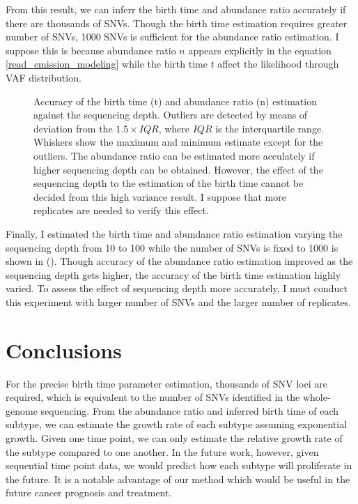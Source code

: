 \documentclass{article}
\begin{document}
From this result, we can inferr the birth time and abundance ratio accurately if there are thousands of SNVs.
Though the birth time estimation requires greater number of SNVs, 1000 SNVs is sufficient for the abundance ratio estimation.
I suppose this is because abundance ratio $n$ appears explicitly in the equation \ref{read_emission_modeling} while the birth time $t$ affect the likelihood through VAF distribution.

\begin{figure}[H]
   \caption{
 Accuracy of the birth time (t) and abundance ratio (n) estimation against the sequencing depth. Outliers are detected by means of deviation from the $1.5 \times IQR$, where $IQR$ is the interquartile range. Whiskers show the maximum and minimum estimate except for the outliers. The abundance ratio can be estimated more acculately if higher sequencing depth can be obtained.
 However, the effect of the sequencing depth to the estimation of the birth time cannot be decided from this high variance result. I suppose that more replicates are needed to verify this effect.
  }
 \label{fig: read_emission_snv}
\end{figure}

Finally, I estimated the birth time and abundance ratio estimation varying the sequencing depth from 10 to 100 while the number of SNVs is fixed to 1000 is shown in ().
Though accuracy of the abundance ratio estimation improved as the sequencing depth gets higher, the accuracy of the birth time estimation highly varied.
To assess the effect of sequencing depth more accurately, I must conduct this experiment with larger number of SNVs and the larger number of replicates.


\section{Conclusions}
 For the precise birth time parameter estimation, thousands of SNV loci are required, which is equivalent to the number of SNVs identified in the whole-genome sequencing. From the abundance ratio and inferred birth time of each subtype, we can estimate the growth rate of each subtype assuming exponential growth. Given one time point, we can only estimate the relative growth rate of the subtype compared to one another. In the future work, however, given sequential time point data, we would predict how each subtype will proliferate in the future. It is a notable advantage of our method which would be useful in the future cancer prognosis and treatment.
\end{document}
